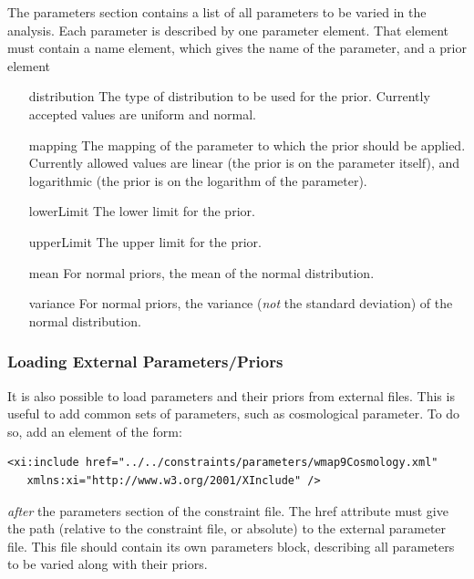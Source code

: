 The {\normalfont \ttfamily parameters} section contains a list of all parameters to be varied in the analysis. Each parameter is described by one {\normalfont \ttfamily parameter} element. That element must contain a {\normalfont \ttfamily name} element, which gives the name of the parameter, and a {\normalfont \ttfamily prior} element 
\begin{itemize}
\item[{\normalfont \ttfamily distribution}] The type of distribution to be used for the prior. Currently accepted values are {\normalfont \ttfamily uniform} and {\normalfont \ttfamily normal}.
\item[{\normalfont \ttfamily mapping}] The mapping of the parameter to which the prior should be applied. Currently allowed values are {\normalfont \ttfamily linear} (the prior is on the parameter itself), and {\normalfont \ttfamily logarithmic} (the prior is on the logarithm of the parameter).
\item[{\normalfont \ttfamily lowerLimit}] The lower limit for the prior.
\item[{\normalfont \ttfamily upperLimit}] The upper limit for the prior.
\item[{\normalfont \ttfamily mean}] For {\normalfont \ttfamily normal} priors, the mean of the normal distribution.
\item[{\normalfont \ttfamily variance}] For {\normalfont \ttfamily normal} priors, the variance (\emph{not} the standard deviation) of the normal distribution.
\end{itemize}

\subsubsection{Loading External Parameters/Priors}

It is also possible to load parameters and their priors from external files. This is useful to add common sets of parameters, such as cosmological parameter. To do so, add an element of the form:
\begin{verbatim}
<xi:include href="../../constraints/parameters/wmap9Cosmology.xml" 
   xmlns:xi="http://www.w3.org/2001/XInclude" />
\end{verbatim}
\emph{after} the {\normalfont \ttfamily parameters} section of the constraint file. The {\normalfont \ttfamily href} attribute must give the path (relative to the constraint file, or absolute) to the external parameter file. This file should contain its own {\normalfont \ttfamily parameters} block, describing all parameters to be varied along with their priors. 

